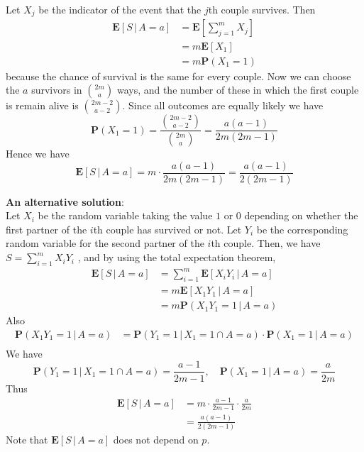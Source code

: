 \documentclass{tufte-handout}
\theoremstyle{definition} \newtheorem{definition}{Definition}
\theoremstyle{definition} \newtheorem{remark}{Remark}
\newcommand{\prob}[1]{\mathbf{P} \left( #1 \right)}
\newcommand{\cprob}[2]{\mathbf{P} \left( #1 \, | \, #2 \right)}
\newcommand{\expt}[1]{\mathbf{E} \left[ #1 \right]}
\newcommand{\cexpt}[2]{\mathbf{E} \left[ #1 \, | \, #2 \right]}
\begin{document}
\begin{solution}
  Let $X_j$ be the indicator of the event that the
  $j$th couple survives. Then
  \begin{align*}
    \cexpt{S}{A = a} & = \expt{\sum_{j = 1} ^m X_j} \\
                     & = m \expt{X_1}\\
                     & = m \prob{X_1 = 1}
  \end{align*}
  because the chance of survival is the same for every couple. Now we can
  choose the $a$ survivors in $\binom{2m}{a}$ ways, and the number of
  these in which the first couple is remain alive is
  $\binom{2m - 2}{a - 2}$. Since all outcomes are equally likely we have
  \begin{equation*}
    \prob{X_1 = 1} = \frac{\binom{2m - 2}{a - 2}}{\binom{2m}{a}}
    = \frac{a(a - 1)}{2m(2m - 1)}
  \end{equation*}
  Hence we have
  \begin{equation*}
    \cexpt{S}{A = a} = m \cdot \frac{a(a - 1)}{2m(2m - 1)}
    = \frac{a(a - 1)}{2(2m - 1)} 
  \end{equation*}

  \noindent \textbf{An alternative solution}:\\
  Let $X_i$ be the random variable taking the value
  $1$ or $0$ depending on whether the first partner of the $i$th couple
  has survived or not. Let $Y_i$ be the corresponding random variable for
  the second partner of the $i$th couple. Then, we have
  $S = \sum_{i=1} ^m X_i Y_i$ , and by using the total expectation theorem,
  \begin{align*}
    \cexpt{S}{A = a} & = \sum_{i = 1} ^m \cexpt{X_i Y_i}{A = a}\\
                     & = m \cexpt{X_1 Y_1}{A = a}\\
                     & = m \cprob{X_1Y_1 = 1}{A = a}
  \end{align*}
  Also
  \begin{align*}
    \cprob{X_1Y_1 = 1}{A = a} & = \cprob{Y_1 = 1}{X_1 = 1 \cap A = a}
                                \cdot \cprob{X_1 = 1}{A = a}\\
  \end{align*}
  We have
  \begin{equation*}
    \cprob{Y_1 = 1}{X_1 = 1 \cap A = a} = \frac{a - 1}{2m - 1}, \quad
    \cprob{X_1 = 1}{A = a} = \frac{a}{2m}
  \end{equation*}
  Thus
  \begin{align*}
    \cexpt{S}{A = a} & = m \cdot \frac{a - 1}{2m - 1} \cdot \frac{a}{2m}\\
                     & = \frac{a(a - 1)}{2(2m - 1)}
  \end{align*}
  Note that $\cexpt{S}{A = a}$ does not depend on $p$.
\end{solution}
\end{document}
